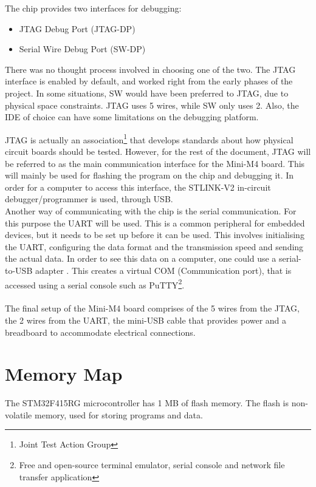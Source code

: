 The chip provides two interfaces for debugging:
\begin{itemize}[noitemsep]
	\item JTAG Debug Port (JTAG-DP)
	\item Serial Wire Debug Port (SW-DP)
\end{itemize}
There was no thought process involved in choosing one of the two.
The JTAG interface is enabled by default, and worked right from the
early phases of the project. In some situations, SW would have been
preferred to JTAG, due to physical space constraints. JTAG uses 5
wires, while SW only uses 2. Also, the IDE of choice can have some limitations
on the debugging platform.

JTAG is actually an association\footnote{Joint Test Action Group\cite{jtag}}
that develops standards about how
physical circuit boards should be tested. However, for the rest of
the document, JTAG will be referred to as the main communication interface
for the Mini-M4 board. This will mainly be used for flashing the program
on the chip and debugging it. In order for a computer to access this
interface, the STLINK-V2 in-circuit debugger/programmer\cite{st_link}
is used, through USB.\\

Another way of communicating with the chip is the serial communication.
For this purpose the UART will be used. This is a common peripheral for
embedded devices, but it needs to be set up before it can be used. This
involves initialising the UART, configuring the data format and the
transmission speed and sending the actual data. In order to see this data
on a computer, one could use a serial-to-USB adapter \cite{ttl_usb}.
This creates a virtual COM (Communication port), that is accessed using
a serial console such as PuTTY\footnote{Free and open-source terminal emulator, serial console and network file transfer application}.
\\\\
The final setup of the Mini-M4 board comprises of the 5 wires from the JTAG,
the 2 wires from the UART, the mini-USB cable that provides power and a
breadboard to accommodate electrical connections.


\section{Memory Map}
\label{sec:memory_map}
The STM32F415RG microcontroller has 1 MB of flash memory. The flash
is non-volatile memory, used for storing programs and
data.\\

